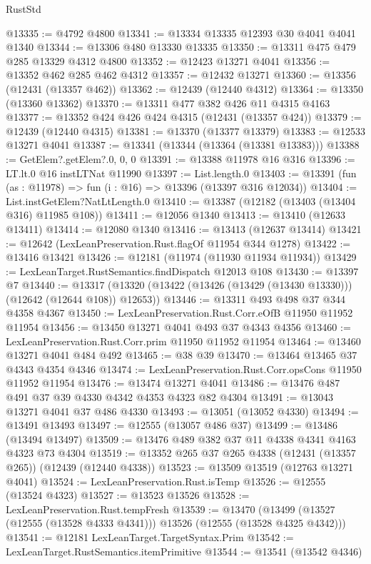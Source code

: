 \begin{lexlean}{RustStd}
\begin{coremodule}
@13335 := @4792 @4800
@13341 := @13334 @13335 @12393 @30 @4041 @4041 @1340
@13344 := @13306 @480 @13330 @13335
@13350 := @13311 @475 @479 @285 @13329 @4312 @4800
@13352 := @12423 @13271 @4041
@13356 := @13352 @462 @285 @462 @4312
@13357 := @12432 @13271
@13360 := @13356 (@12431 (@13357 @462))
@13362 := @12439 (@12440 @4312)
@13364 := @13350 (@13360 @13362)
@13370 := @13311 @477 @382 @426 @11 @4315 @4163
@13377 := @13352 @424 @426 @424 @4315 (@12431 (@13357 @424))
@13379 := @12439 (@12440 @4315)
@13381 := @13370 (@13377 @13379)
@13383 := @12533 @13271 @4041
@13387 := @13341 (@13344 (@13364 (@13381 @13383)))
@13388 := GetElem?.getElem?.{0, 0, 0}
@13391 := @13388 @11978 @16 @316
@13396 := LT.lt.{0} @16 instLTNat @11990
@13397 := List.length.{0}
@13403 := @13391 (fun (as : @11978) => fun (i : @16) => @13396 (@13397 @316 @12034))
@13404 := List.instGetElem?NatLtLength.{0}
@13410 := @13387 (@12182 (@13403 (@13404 @316) @11985 @108))
@13411 := @12056 @1340
@13413 := @13410 (@12633 @13411)
@13414 := @12080 @1340
@13416 := @13413 (@12637 @13414)
@13421 := @12642 (LexLeanPreservation.Rust.flagOf @11954 @344 @1278)
@13422 := @13416 @13421
@13426 := @12181 (@11974 (@11930 @11934 @11934))
@13429 := LexLeanTarget.RustSemantics.findDispatch @12013 @108
@13430 := @13397 @7
@13440 := @13317 (@13320 (@13422 (@13426 (@13429 (@13430 @13330))) (@12642 (@12644 @108)) @12653))
@13446 := @13311 @493 @498 @37 @344 @4358 @4367
@13450 := LexLeanPreservation.Rust.Corr.eOfB @11950 @11952 @11954
@13456 := @13450 @13271 @4041 @493 @37 @4343 @4356
@13460 := LexLeanPreservation.Rust.Corr.prim @11950 @11952 @11954
@13464 := @13460 @13271 @4041 @484 @492
@13465 := @38 @39
@13470 := @13464 @13465 @37 @4343 @4354 @4346
@13474 := LexLeanPreservation.Rust.Corr.opsCons @11950 @11952 @11954
@13476 := @13474 @13271 @4041
@13486 := @13476 @487 @491 @37 @39 @4330 @4342 @4353 @4323 @82 @4304
@13491 := @13043 @13271 @4041 @37 @486 @4330
@13493 := @13051 (@13052 @4330)
@13494 := @13491 @13493
@13497 := @12555 (@13057 @486 @37)
@13499 := @13486 (@13494 @13497)
@13509 := @13476 @489 @382 @37 @11 @4338 @4341 @4163 @4323 @73 @4304
@13519 := @13352 @265 @37 @265 @4338 (@12431 (@13357 @265)) (@12439 (@12440 @4338))
@13523 := @13509 @13519 (@12763 @13271 @4041)
@13524 := LexLeanPreservation.Rust.isTemp
@13526 := @12555 (@13524 @4323)
@13527 := @13523 @13526
@13528 := LexLeanPreservation.Rust.tempFresh
@13539 := @13470
    (@13499 (@13527 (@12555 (@13528 @4333 @4341))) @13526 (@12555 (@13528 @4325 @4342)))
@13541 := @12181 LexLeanTarget.TargetSyntax.Prim
@13542 := LexLeanTarget.RustSemantics.itemPrimitive
@13544 := @13541 (@13542 @4346)

\end{coremodule}
\end{lexlean}
